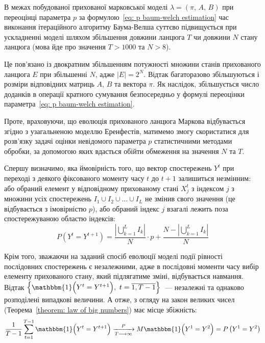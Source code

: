 В межах побудованої прихованої марковської моделі $\lambda=(\pi,\,A,\,B)$ при переоцінці параметра $p$ за формулою~\eqref{eq: p baum-welch estimation} час виконання ітераційного алгоритму Баума-Велша суттєво підвищується при ускладненні моделі шляхом збільшення довжини ланцюга $T$ чи довжини $N$ стану ланцюга (мова йде про значення $T>1000$ та $N>8$). 

Це пов'язано із двократним збільшенням потужності множини станів прихованого ланцюга $E$ при збільшенні $N$, адже $|E|=2^N$. Відтак багаторазово збільшуються і розміри відповідних матриць $A$, $B$ та вектора $\pi$. Як наслідок, збільшується число доданків в операції кратного сумування безпосередньо у формулі переоцінки параметра~\eqref{eq: p baum-welch estimation}.

Проте, враховуючи, що еволюція прихованого ланцюга Маркова відбувається згідно з узагальненою моделлю Еренфестів, матимемо змогу скористатися для розв'язку задачі оцінки невідомого параметра $p$ статистичними методами обробки, за допомогою яких вдасться обійти обмеження на значення $N$ та $T$.

Спершу визначимо, яка ймовірність того, що вектор спостережень $Y^t$ при переході з деякого фіксованого моменту часу $t$ до $t+1$ залишиться незмінним: або обраний елемент у відповідному прихованому стані $X^t_j$ з індексом $j$ з множини усіх спостережень $I_1 \cup I_2 \cup \ldots \cup I_L$ не змінив свого значення (це відбувається з імовірністю $p$), або обраний індекс $j$ взагалі лежить поза спостережуваною областю індексів:
\begin{equation}\label{eq: equality of successive observations}
    P\left( Y^t=Y^{t+1} \right) = \frac{\left| \bigcup\limits_{k=1}^{L}I_k \right|}{N}\cdot p + \frac{N-\left| \bigcup\limits_{k=1}^{L}I_k \right|}{N}
\end{equation}

Крім того, зважаючи на заданий спосіб еволюції моделі події рівності послідовних спостережень є незалежними, адже в послідовні моменти часу вибір елементу прихованого стану, який підлягатиме зміні, відбувається навмання. Відтак $\left\{ \mathbbm{1} \Bigl( Y^t=Y^{t+1} \Bigr),\ t=\overline{1,T-1} \right\}$~--- незалежні та однаково розподілені випадкові величини. А отже, з огляду на закон великих чисел (Теорема~\ref{theorem: law of big numbers}) має місце збіжність:
\begin{equation}\label{eq: LBN parameter p}
    \frac{1}{T-1}\sum_{t=1}^{T-1}\mathbbm{1} \Bigl( Y^t=Y^{t+1} \Bigr) \xrightarrow[T \longrightarrow \infty]{P} M\mathbbm{1} \Bigl( Y^1=Y^2 \Bigr) = P\left( Y^1=Y^2 \right)
\end{equation}

